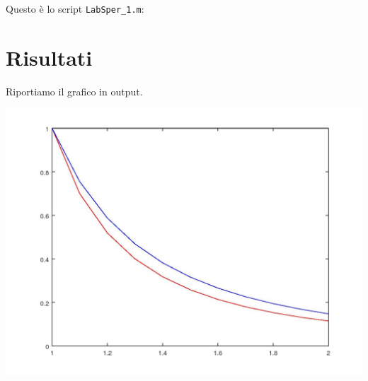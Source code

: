 \documentclass{article}
\begin{document}
	
	
	Questo è lo script {\tt LabSper\_1.m}:
	
	
	
	\section{Risultati}
	
	Riportiamo il grafico in output.
	
	\includegraphics[width=\textwidth]{soluzioni.jpeg}
\end{document}
